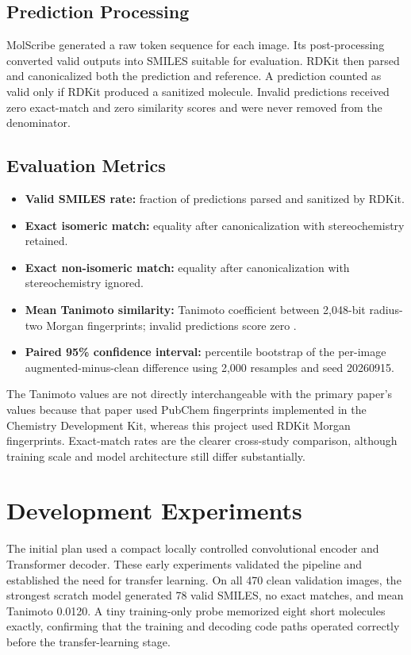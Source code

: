 \documentclass[11pt,a4paper]{article}
\begin{document}
\subsection*{Prediction Processing}

MolScribe generated a raw token sequence for each image. Its post-processing converted valid
outputs into SMILES suitable for evaluation. RDKit then parsed and canonicalized both the
prediction and reference. A prediction counted as valid only if RDKit produced a sanitized
molecule. Invalid predictions received zero exact-match and zero similarity scores and were
never removed from the denominator.

\subsection*{Evaluation Metrics}

\begin{itemize}
  \item \textbf{Valid SMILES rate:} fraction of predictions parsed and sanitized by RDKit.
  \item \textbf{Exact isomeric match:} equality after canonicalization with stereochemistry retained.
  \item \textbf{Exact non-isomeric match:} equality after canonicalization with stereochemistry ignored.
  \item \textbf{Mean Tanimoto similarity:} Tanimoto coefficient between 2,048-bit radius-two Morgan fingerprints; invalid predictions score zero \cite{rogers2010}.
  \item \textbf{Paired 95\% confidence interval:} percentile bootstrap of the per-image augmented-minus-clean difference using 2,000 resamples and seed 20260915.
\end{itemize}

The Tanimoto values are not directly interchangeable with the primary paper's values because
that paper used PubChem fingerprints implemented in the Chemistry Development Kit, whereas
this project used RDKit Morgan fingerprints. Exact-match rates are the clearer cross-study
comparison, although training scale and model architecture still differ substantially.

\section*{Development Experiments}

The initial plan used a compact locally controlled convolutional encoder and Transformer
decoder. These early experiments validated the pipeline and established the need for transfer
learning. On all 470 clean validation images, the strongest scratch model
generated 78 valid SMILES, no exact matches, and mean Tanimoto 0.0120. A tiny training-only
probe memorized eight short molecules exactly, confirming that the training and decoding code
paths operated correctly before the transfer-learning stage.
\end{document}
